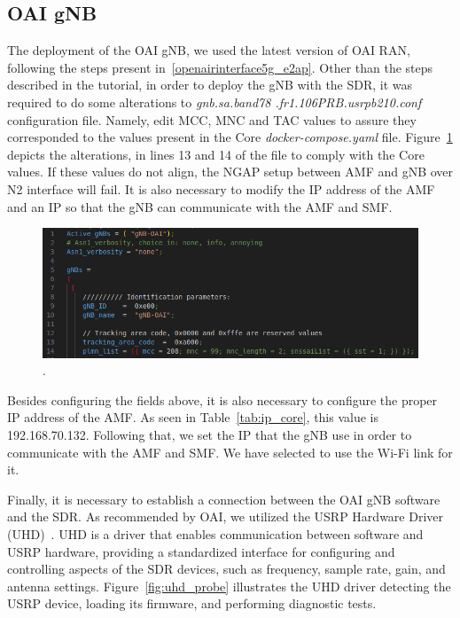 \subsection{OAI gNB}\label{subsec:oai-gnb}
The deployment of the OAI gNB, we used the latest version of OAI RAN, following the steps present in~\ref{openairinterface5g_e2ap}.
Other than the steps described in the tutorial, in order to deploy the gNB with the SDR, it was required to do some alterations to \textit{gnb.sa.band78
.fr1.106PRB.usrpb210.conf} configuration file.
Namely, edit MCC, MNC and TAC values to assure they corresponded to the values present in the Core \textit{docker-compose.yaml} file.
Figure~\ref{fig:gnb_conf} depicts the alterations, in lines 13 and 14 of the file to comply with the Core values.
If these values do not align, the NGAP setup between AMF and gNB over N2 interface will fail.
It is also necessary to modify the IP address of the AMF and an IP so that the gNB can communicate with the AMF and SMF\@.

\begin{figure}[H]
    \centering
    \includegraphics[width=0.7\linewidth]{figures/gnb_conf}
    \caption{.}
    \label{fig:gnb_conf}
\end{figure}

Besides configuring the fields above, it is also necessary to configure the proper IP address of the AMF\@.
As seen in Table~\ref{tab:ip_core}, this value is 192.168.70.132.
Following that, we set the IP that the gNB use in order to communicate with the AMF and SMF\@.
We have selected to use the Wi-Fi link for it.


Finally, it is necessary to establish a connection between the OAI gNB software and the SDR\@.
As recommended by OAI, we utilized the USRP Hardware Driver (UHD)~\cite{uhdusrpdriver}.
UHD is a driver that enables communication between software and USRP hardware, providing a standardized interface for configuring and controlling aspects of the SDR devices, such as frequency, sample rate, gain, and antenna settings.
Figure~\ref{fig:uhd_probe} illustrates the UHD driver detecting the USRP device, loading its firmware, and performing diagnostic tests.

